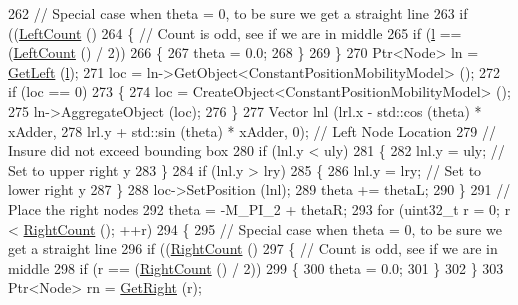 \begin{DoxyCode}
262       \textcolor{comment}{// Special case when theta = 0, to be sure we get a straight line}
263       \textcolor{keywordflow}{if} ((\hyperlink{classns3_1_1PointToPointDumbbellHelper_a6a1fd00ea7d546fc3b45054eb3144a51}{LeftCount} () %
264         \{ \textcolor{comment}{// Count is odd, see if we are in middle}
265           \textcolor{keywordflow}{if} (\hyperlink{buildings__pathloss_8m_a5b54c0a045f179bcbbbc9abcb8b5cd4c}{l} == (\hyperlink{classns3_1_1PointToPointDumbbellHelper_a6a1fd00ea7d546fc3b45054eb3144a51}{LeftCount} () / 2))
266             \{
267               theta = 0.0;
268             \}
269         \}
270       Ptr<Node> ln = \hyperlink{classns3_1_1PointToPointDumbbellHelper_a8933bfa2a6f97c2be38a4808e5fa9ec4}{GetLeft} (\hyperlink{buildings__pathloss_8m_a5b54c0a045f179bcbbbc9abcb8b5cd4c}{l});
271       loc = ln->GetObject<ConstantPositionMobilityModel> ();
272       \textcolor{keywordflow}{if} (loc == 0)
273         \{
274           loc = CreateObject<ConstantPositionMobilityModel> ();
275           ln->AggregateObject (loc);
276         \}
277       Vector lnl (lrl.x - std::cos (theta) * xAdder,
278                   lrl.y + std::sin (theta) * xAdder, 0);   \textcolor{comment}{// Left Node Location}
279       \textcolor{comment}{// Insure did not exceed bounding box}
280       \textcolor{keywordflow}{if} (lnl.y < uly) 
281         \{
282           lnl.y = uly; \textcolor{comment}{// Set to upper right y}
283         \}
284       \textcolor{keywordflow}{if} (lnl.y > lry) 
285         \{
286           lnl.y = lry; \textcolor{comment}{// Set to lower right y}
287         \}
288       loc->SetPosition (lnl);
289       theta += thetaL;
290     \}
291   \textcolor{comment}{// Place the right nodes}
292   theta = -M\_PI\_2 + thetaR;
293   \textcolor{keywordflow}{for} (uint32\_t r = 0; r < \hyperlink{classns3_1_1PointToPointDumbbellHelper_ae70148ba832410e8a7a030a323102d97}{RightCount} (); ++r)
294     \{
295       \textcolor{comment}{// Special case when theta = 0, to be sure we get a straight line}
296       \textcolor{keywordflow}{if} ((\hyperlink{classns3_1_1PointToPointDumbbellHelper_ae70148ba832410e8a7a030a323102d97}{RightCount} () %
297         \{ \textcolor{comment}{// Count is odd, see if we are in middle}
298           \textcolor{keywordflow}{if} (r == (\hyperlink{classns3_1_1PointToPointDumbbellHelper_ae70148ba832410e8a7a030a323102d97}{RightCount} () / 2))
299             \{
300               theta = 0.0;
301             \}
302         \}
303       Ptr<Node> rn = \hyperlink{classns3_1_1PointToPointDumbbellHelper_aa68edfbee375a687aa1dd98a9a6c238b}{GetRight} (r);

\end{DoxyCode}
